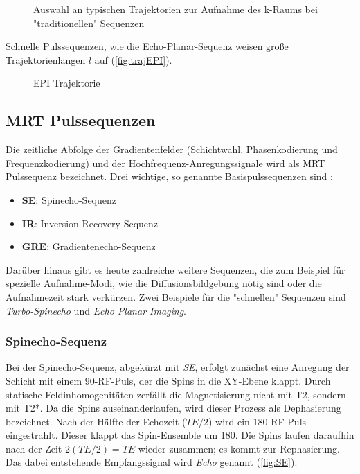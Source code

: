 \begin{figure}[H]
	\centering
	\hfill
	\hfill
	\caption{Auswahl an typischen Trajektorien zur Aufnahme des k-Raums bei "traditionellen" Sequenzen}
	\label{fig:trajClassic}
\end{figure}

Schnelle Pulssequenzen, wie die Echo-Planar-Sequenz weisen große Trajektorienlängen $l$ auf (\autoref{fig:trajEPI}).

\begin{figure}[H]
	\centering
	\caption[Echoplanar Sequenz]{EPI Trajektorie}
	\label{fig:trajEPI}
\end{figure} 

\subsection{MRT Pulssequenzen}
Die zeitliche Abfolge der Gradientenfelder (Schichtwahl, Phasenkodierung und Frequenzkodierung) und der Hochfrequenz-Anregungssignale wird als MRT Pulssequenz bezeichnet.
Drei wichtige, so genannte Basispulssequenzen sind \cite[S. 999]{Weishaupt2014}:
\begin{itemize}
	\item \textbf{SE}: Spinecho-Sequenz
	\item \textbf{IR}: Inversion-Recovery-Sequenz
	\item \textbf{GRE}: Gradientenecho-Sequenz
\end{itemize}

Darüber hinaus gibt es heute zahlreiche weitere Sequenzen, die zum Beispiel für spezielle Aufnahme-Modi, wie die Diffusionsbildgebung nötig sind oder die Aufnahmezeit stark verkürzen. Zwei Beispiele für die "schnellen" Sequenzen sind \textit{Turbo-Spinecho} und \textit{Echo Planar Imaging}.


\subsubsection{Spinecho-Sequenz}
\label{sec:SE}
Bei der Spinecho-Sequenz, abgekürzt mit \textit{SE}, erfolgt zunächst eine Anregung der Schicht mit einem 90\degree-RF-Puls, der die Spins in die XY-Ebene klappt. Durch statische Feldinhomogenitäten zerfällt die Magnetisierung nicht mit T2, sondern mit T2*. Da die Spins auseinanderlaufen, wird dieser Prozess als Dephasierung bezeichnet. Nach der Hälfte der Echozeit ($TE/2$) wird ein 180\degree-RF-Puls eingestrahlt. Dieser klappt das Spin-Ensemble um 180\degree. Die Spins laufen daraufhin nach der Zeit $2(TE/2) = TE$ wieder zusammen; es kommt zur Rephasierung. Das dabei entstehende Empfangssignal wird \textit{Echo} genannt (\autoref{fig:SE}).

